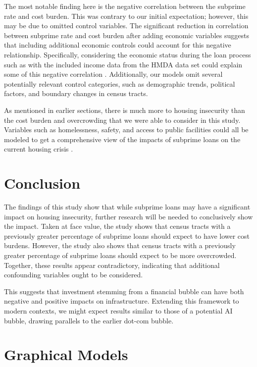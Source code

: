 \documentclass{article}
\begin{document}
The most notable finding here is the negative correlation between the subprime rate and cost burden. This was contrary to our initial expectation; however, this may be due to omitted control variables. The significant reduction in correlation between subprime rate and cost burden after adding economic variables suggests that including additional economic controls could account for this negative relationship. Specifically, considering the economic status during the loan process such as with the included income data from the HMDA data set could explain some of this negative correlation \cite{cfpb_hmda_2007_2010}. Additionally, our models omit several potentially relevant control categories, such as demographic trends, political factors, and boundary changes in census tracts. 

As mentioned in earlier sections, there is much more to housing insecurity than the cost burden and overcrowding that we were able to consider in this study. Variables such as homelessness, safety, and access to public facilities could all be modeled to get a comprehensive view of the impacts of subprime loans on the current housing crisis \cite{leopold2016improving}. 

\section{Conclusion}

The findings of this study show that while subprime loans may have a significant impact on housing insecurity, further research will be needed to conclusively show the impact. Taken at face value, the study shows that census tracts with a previously greater percentage of subprime loans should expect to have lower cost burdens. However, the study also shows that census tracts with a previously greater percentage of subprime loans should expect to be more overcrowded. Together, these results appear contradictory, indicating that additional confounding variables ought to be considered. 

This suggests that investment stemming from a financial bubble can have both negative and positive impacts on infrastructure. Extending this framework to modern contexts, we might expect results similar to those of a potential AI bubble, drawing parallels to the earlier dot-com bubble. 




\appendix

\section{Graphical Models}
\end{document}
